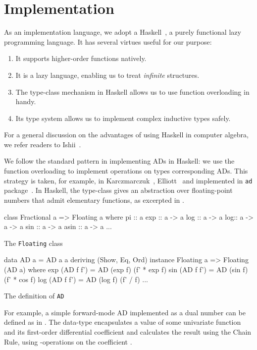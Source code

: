 \documentclass[./rims-smooth-paper.tex]{subfiles}
\begin{document}
\section{Implementation}
\label{sec:impl}
As an implementation language, we adopt a Haskell~\cite{haskell.org:2021tt}, a purely functional lazy programming language.
It has several virtues useful for our purpose:
\begin{enumerate}
\item It supports higher-order functions natively.
\item It is a lazy language, enabling us to treat \emph{infinite} structures.
\item The type-class mechanism in Haskell allows us to use function overloading in handy.
\item Its type system allows us to implement complex inductive types safely.
\end{enumerate}
For a general discussion on the advantages of using Haskell in computer algebra, we refer readers to Ishii~\cite{ISHII:2018ek}.

We follow the standard pattern in implementing ADs in Haskell: we use the function overloading to implement operations on types corresponding ADs.
This strategy is taken, for example, in Karczmarczuk~\cite{Karczmarczuk:2001ww}, Elliott~\cite{Elliott2009-beautiful-differentiation} and implemented in \texttt{ad} package~\cite{Kmett:2010aa}.
In Haskell, the  type-class gives an abstraction over floating-point numbers that admit elementary functions, as excerpted in .
\begin{listing}[tbp]
\begin{code}
class Fractional a => Floating a where
  pi :: a
  exp :: a -> a
  log :: a -> a
  log\base :: a -> a -> a
  sin :: a -> a
  asin :: a -> a
  ...
\end{code}
\caption{The \texttt{Floating} class\label{lst:cls-floating}}
\end{listing}
\begin{listing}[tbp]
\begin{code}
  data AD a = AD a a deriving (Show, Eq, Ord)
  instance Floating a => Floating (AD a) where
    exp (AD f f') = AD (exp f) (f' * exp f)
    sin (AD f f') = AD (sin f) (f' * cos f)
    log (AD f f') = AD (log f) (f' / f)
    ...
\end{code}
\caption{The definition of \texttt{AD}\label{lst:def-AD}}
\end{listing}

For example, a simple forward-mode AD implemented as a dual number can be defined as in .
The data-type  encapsulates a value of some univariate function and its first-order differential coefficient and calculates the result using the Chain Rule, using -operations on the coefficient .
\end{document}
